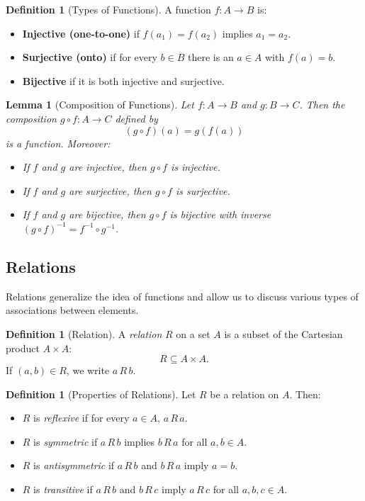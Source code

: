 \documentclass[12pt]{article}
\newtheorem{lemma}[theorem]{Lemma}
\theoremstyle{definition}
\newtheorem{definition}[theorem]{Definition}
\begin{document}
\begin{definition}[Types of Functions]
  A function \(f: A \to B\) is:
  \begin{itemize}[itemsep=3pt]
    \item \textbf{Injective (one-to-one)} if \(f(a_1)=f(a_2)\) implies \(a_1 = a_2\).
    \item \textbf{Surjective (onto)} if for every \(b \in B\) there is an \(a \in A\) with \(f(a)=b\).
    \item \textbf{Bijective} if it is both injective and surjective.
  \end{itemize}
\end{definition}

\begin{lemma}[Composition of Functions]
  Let \(f: A \to B\) and \(g: B \to C\). Then the composition \(g \circ f: A \to C\) defined by
  \[
  (g \circ f)(a) = g(f(a))
  \]
  is a function. Moreover:
  \begin{itemize}
    \item If \(f\) and \(g\) are injective, then \(g \circ f\) is injective.
    \item If \(f\) and \(g\) are surjective, then \(g \circ f\) is surjective.
    \item If \(f\) and \(g\) are bijective, then \(g \circ f\) is bijective with inverse \((g \circ f)^{-1} = f^{-1} \circ g^{-1}\).
  \end{itemize}
\end{lemma}

\subsection{Relations}

Relations generalize the idea of functions and allow us to discuss various types of associations between elements.

\begin{definition}[Relation]
  A \emph{relation} \(R\) on a set \(A\) is a subset of the Cartesian product \(A \times A\):
  \[
  R \subseteq A \times A.
  \]
  If \((a,b) \in R\), we write \(a\,R\,b\).
\end{definition}

\begin{definition}[Properties of Relations]
  Let \(R\) be a relation on \(A\). Then:
  \begin{itemize}[itemsep=3pt]
    \item \(R\) is \emph{reflexive} if for every \(a \in A\), \(a\,R\,a\).
    \item \(R\) is \emph{symmetric} if \(a\,R\,b\) implies \(b\,R\,a\) for all \(a,b \in A\).
    \item \(R\) is \emph{antisymmetric} if \(a\,R\,b\) and \(b\,R\,a\) imply \(a=b\).
    \item \(R\) is \emph{transitive} if \(a\,R\,b\) and \(b\,R\,c\) imply \(a\,R\,c\) for all \(a,b,c \in A\).
  \end{itemize}
\end{definition}
\end{document}
